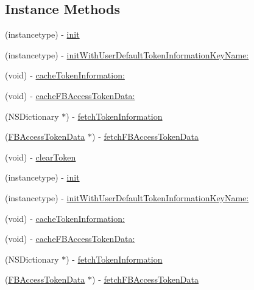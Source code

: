 \subsection*{Instance Methods}
\begin{DoxyCompactItemize}
\item 
(instancetype) -\/ \hyperlink{interfaceFBSessionTokenCachingStrategy_adf7a7150fecc4aab6dea9e7c0b64760b}{init}
\item 
(instancetype) -\/ \hyperlink{interfaceFBSessionTokenCachingStrategy_a450317ada46fcbed38bf0edf0d0cede9}{init\+With\+User\+Default\+Token\+Information\+Key\+Name\+:}
\item 
(void) -\/ \hyperlink{interfaceFBSessionTokenCachingStrategy_a89929f2fc1d8d29bb1add6e607d7c864}{cache\+Token\+Information\+:}
\item 
(void) -\/ \hyperlink{interfaceFBSessionTokenCachingStrategy_a35d668a867fcc88c491bb8d0c815c9f9}{cache\+F\+B\+Access\+Token\+Data\+:}
\item 
(N\+S\+Dictionary $\ast$) -\/ \hyperlink{interfaceFBSessionTokenCachingStrategy_a08b75ac08ae3b7a1ad769f3b026f857c}{fetch\+Token\+Information}
\item 
(\hyperlink{interfaceFBAccessTokenData}{F\+B\+Access\+Token\+Data} $\ast$) -\/ \hyperlink{interfaceFBSessionTokenCachingStrategy_a7378a3d9006864d343e086bbfbe66948}{fetch\+F\+B\+Access\+Token\+Data}
\item 
(void) -\/ \hyperlink{interfaceFBSessionTokenCachingStrategy_a4cc3c2711517839cecad4b3047a28f85}{clear\+Token}
\item 
(instancetype) -\/ \hyperlink{interfaceFBSessionTokenCachingStrategy_adf7a7150fecc4aab6dea9e7c0b64760b}{init}
\item 
(instancetype) -\/ \hyperlink{interfaceFBSessionTokenCachingStrategy_a450317ada46fcbed38bf0edf0d0cede9}{init\+With\+User\+Default\+Token\+Information\+Key\+Name\+:}
\item 
(void) -\/ \hyperlink{interfaceFBSessionTokenCachingStrategy_a89929f2fc1d8d29bb1add6e607d7c864}{cache\+Token\+Information\+:}
\item 
(void) -\/ \hyperlink{interfaceFBSessionTokenCachingStrategy_a35d668a867fcc88c491bb8d0c815c9f9}{cache\+F\+B\+Access\+Token\+Data\+:}
\item 
(N\+S\+Dictionary $\ast$) -\/ \hyperlink{interfaceFBSessionTokenCachingStrategy_a08b75ac08ae3b7a1ad769f3b026f857c}{fetch\+Token\+Information}
\item 
(\hyperlink{interfaceFBAccessTokenData}{F\+B\+Access\+Token\+Data} $\ast$) -\/ \hyperlink{interfaceFBSessionTokenCachingStrategy_a7378a3d9006864d343e086bbfbe66948}{fetch\+F\+B\+Access\+Token\+Data}

\end{DoxyCompactItemize}
